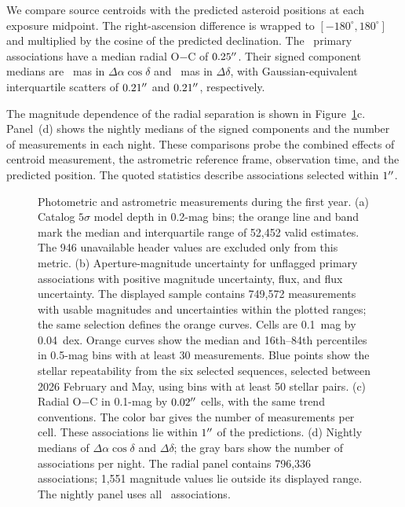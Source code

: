 \label{sec:astrometry}
We compare source centroids with the predicted asteroid positions
at each exposure midpoint. The right-ascension difference is
wrapped to $[-180^\circ,180^\circ]$ and multiplied by the cosine
of the predicted declination. The \yrNAssoc\ primary associations
have a median radial O$-$C of $0.25^{\prime\prime}$. Their signed component
medians are \yrRAOffset~mas in $\Delta\alpha\cos\delta$ and
\yrDecOffset~mas in $\Delta\delta$, with Gaussian-equivalent
interquartile scatters of $0.21^{\prime\prime}$ and
$0.21^{\prime\prime}$, respectively.

The magnitude dependence of the radial separation is shown in
Figure~\ref{fig:quality}c. Panel~(d) shows the nightly medians of
the signed components and the number of measurements in each
night. These comparisons probe the combined effects of centroid
measurement, the astrometric reference frame, observation time,
and the predicted position. The quoted statistics describe
associations selected within $1^{\prime\prime}$.

\begin{figure}[tbp]
\centering
{}
\caption{Photometric and astrometric measurements during the first
year. (a) Catalog $5\sigma$ model depth in 0.2-mag bins; the orange
line and band mark the median and interquartile range of 52,452 valid estimates. The 946 unavailable header values are excluded only from this metric.
(b) Aperture-magnitude uncertainty for unflagged primary associations
with positive magnitude uncertainty, flux, and flux uncertainty.
The displayed sample contains
749,572 measurements with usable magnitudes and uncertainties
within the plotted ranges; the same selection defines the orange curves.
Cells are 0.1~mag by 0.04~dex. Orange curves show the median and
16th--84th percentiles in 0.5-mag bins with at least 30 measurements.
Blue points show the stellar repeatability from the six selected
sequences, selected between 2026 February and May, using bins with at least 50 stellar pairs.
(c) Radial O$-$C in 0.1-mag by $0.02^{\prime\prime}$ cells, with the same
trend conventions. The color bar gives the number of measurements
per cell. These associations lie within $1^{\prime\prime}$ of the predictions.
(d) Nightly medians of $\Delta\alpha\cos\delta$ and $\Delta\delta$;
the gray bars show the number of associations per night.
The radial panel contains 796,336 associations;
1,551 magnitude values lie outside its displayed range.
The nightly panel uses all \yrNAssoc\ associations.}
\label{fig:quality}
\end{figure}

